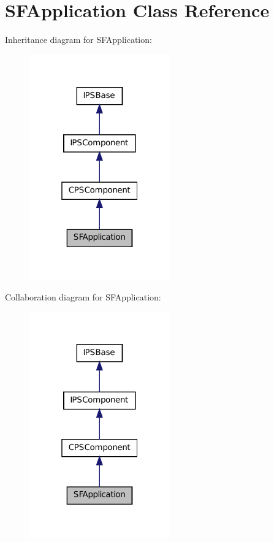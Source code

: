 \hypertarget{classSFApplication}{
\section{SFApplication Class Reference}
\label{classSFApplication}
}


Inheritance diagram for SFApplication:\nopagebreak
\begin{figure}[H]
\begin{center}
\leavevmode
\includegraphics[width=172pt]{classSFApplication__inherit__graph}
\end{center}
\end{figure}


Collaboration diagram for SFApplication:\nopagebreak
\begin{figure}[H]
\begin{center}
\leavevmode
\includegraphics[width=172pt]{classSFApplication__coll__graph}
\end{center}
\end{figure}
